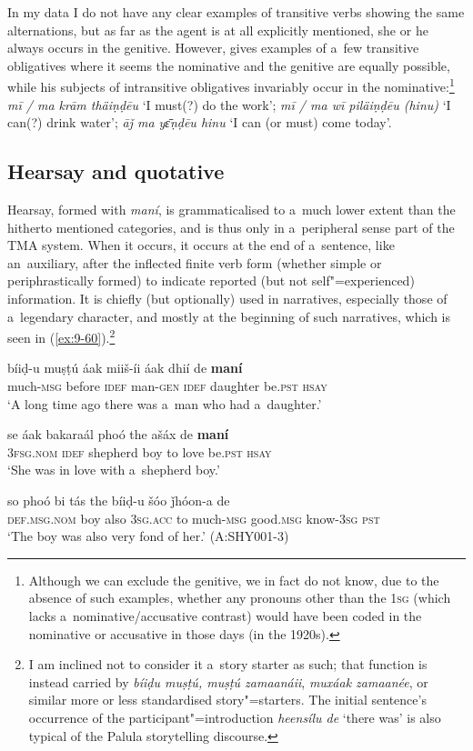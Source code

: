 In my data I do not have any clear examples of transitive verbs showing the same alternations, but as far as the agent is at all explicitly mentioned, she or he always occurs in the genitive. However, \citet[24]{morgenstierne1941} gives examples of a~few transitive obligatives where it seems the nominative and the genitive are equally possible, while his subjects of intransitive obligatives invariably occur in the nominative:\footnote{Although we can exclude the genitive, we in fact do not know, due to the absence of such examples, whether any pronouns other than the \textsc{1sg} (which lacks a~nominative/accusative contrast) would have been coded in the nominative or accusative in those days (in the 1920s).} \textit{mī / ma krām thäiṇḍēu} `I must(?) do the work'; \textit{mī / ma wī piläiṇḍēu (hinu)} `I can(?) drink water'; \textit{āǰ ma yɛ̄ṇḍēu hinu} `I can (or must) come today'.


\subsection{Hearsay and quotative}
\label{subsec:9-2-4}

Hearsay, formed with \textit{maní}, is grammaticalised to a~much lower extent than the hitherto mentioned categories, and is thus only in a~peripheral sense part of the TMA system. When it occurs, it occurs at the end of a~sentence, like an~auxiliary, after the inflected finite verb form (whether simple or periphrastically formed) to indicate reported (but not self"=experienced) information. It is chiefly (but optionally) used in narratives, especially those of a~legendary character, and mostly at the beginning of such narratives, which is seen in (\ref{ex:9-60}).\footnote{I am inclined not to consider it a~story starter as such; that function is instead carried by \textit{bíiḍu muṣṭú, muṣṭú zamaanáii}, \textit{muxáak zamaanée}, or similar more or less standardised story"=starters. The initial sentence's occurrence of the participant"=introduction \textit{heensílu de} `there was' is also typical of the Palula storytelling discourse.} 

\begin{exe}
\ex
\label{ex:9-60}
\gll \label{bkm:Ref190746425}bíiḍ-u muṣṭú áak miiš-íi áak dhií de \textbf{maní} \\
much-\textsc{msg} before \textsc{idef} man-\textsc{gen} \textsc{idef} daughter be.\textsc{pst}
\textsc{hsay} \\
\glt `A long time ago there was a~man who had a~daughter.' 

\gll se áak bakaraál phoó the ašáx de \textbf{maní} \\
\textsc{3fsg.nom} \textsc{idef} shepherd boy to love be.\textsc{pst} \textsc{hsay} \\
\glt `She was in love with a~shepherd boy.'

\gll so phoó bi tás the bíiḍ-u  šóo ǰhóon-a de \\
\textsc{def.msg.nom} boy also \textsc{3sg.acc} to much-\textsc{msg}  good.\textsc{msg} know-\textsc{3sg} \textsc{pst} \\
\glt `The boy was also very fond of her.' (A:SHY001-3)
\end{exe}

